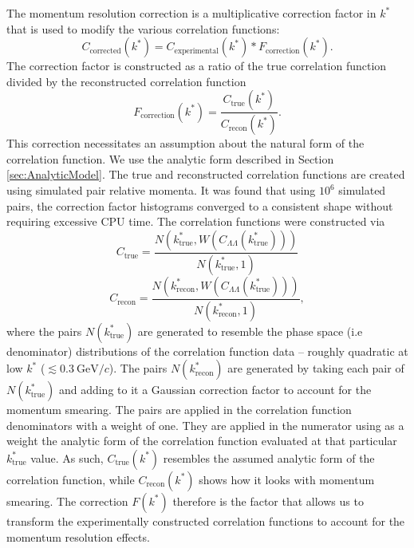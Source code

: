 The momentum resolution correction is a multiplicative correction factor in $k^*$ that is used to modify the various correlation functions:
\begin{equation}
C_\mathrm{corrected}(k^*) = C_{\mathrm{experimental}}(k^*)*F_\mathrm{correction}(k^*).
\end{equation}
The correction factor is constructed as a ratio of the true correlation function divided by the reconstructed correlation function
\begin{equation}
F_\mathrm{correction}(k^*)=\frac{C_\mathrm{true}(k^*)}{C_\mathrm{recon}(k^*)}.
\end{equation}
This correction necessitates an assumption about the natural form of the correlation function.  We use the analytic form described in Section \ref{sec:AnalyticModel}.  
The true and reconstructed correlation functions are created using simulated pair relative momenta.  
It was found that using $10^6$ simulated pairs, the correction factor histograms converged to a consistent shape without requiring excessive CPU time.  
The correlation functions were constructed via
\begin{equation}
\label{eq:Ctrue}
C_{\mathrm{true}} = \frac{ N(k^*_{\mathrm{true}},W(C_{\Lambda\Lambda}(k^*_{\mathrm{true}})))}{N(k^*_{\mathrm{true}},1)}
\end{equation}
\begin{equation}
\label{eq:Crecon}
C_{\mathrm{recon}} = \frac{ N(k^*_{\mathrm{recon}},W(C_{\Lambda\Lambda}(k^*_{\mathrm{true}})))}{N(k^*_{\mathrm{recon}},1)},
\end{equation}
where the pairs $N(k^*_\mathrm{true})$ are generated to resemble the phase space (i.e denominator) distributions of the correlation function data -- roughly quadratic at low $k^*$ ($\lesssim 0.3 \ \mathrm{GeV}/c$).  
The pairs $N(k^*_\mathrm{recon})$ are generated by taking each pair of $N(k^*_\mathrm{true})$ and adding to it a Gaussian correction factor to account for the momentum smearing.  
The pairs are applied in the correlation function denominators with a weight of one.  
They are applied in the numerator using as a weight the analytic form of the correlation function evaluated at that particular $k^*_{\mathrm{true}}$ value.  
As such, $C_{\mathrm{true}}(k^*)$ resembles the assumed analytic form of the correlation function, while $C_{\mathrm{recon}}(k^*)$ shows how it looks with momentum smearing.  
The correction $F(k^*)$ therefore is the factor that allows us to transform the experimentally constructed correlation functions to account for the momentum resolution effects.

